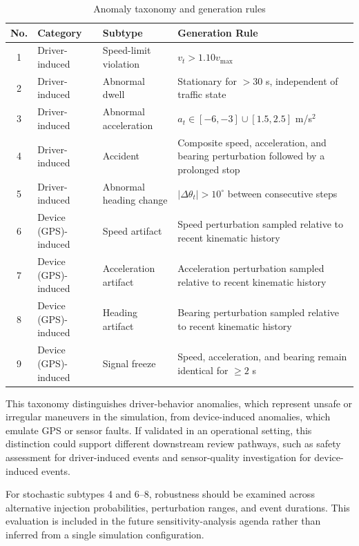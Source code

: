 \documentclass[journal]{IEEEtran}
\begin{document}
\begin{table}[!htbp]
  \centering
  \caption{Anomaly taxonomy and generation rules}
  \label{tab:anomaly_taxonomy}
  \renewcommand{\arraystretch}{1.15}
  \footnotesize
  \begin{tabularx}{\columnwidth}{@{}c>{\raggedright\arraybackslash}p{}>{\raggedright\arraybackslash}p{}>{\raggedright\arraybackslash}X@{}}
    \toprule
    \textbf{No.} & \textbf{Category} & \textbf{Subtype} & \textbf{Generation Rule} \\ \midrule
    1 & Driver-induced & Speed-limit violation & $v_t > 1.10v_{\max}$ \\
    2 & Driver-induced & Abnormal dwell & Stationary for $>30$ s, independent of traffic state \\
    3 & Driver-induced & Abnormal acceleration & $a_t\in[-6,-3]\cup[1.5,2.5]$ m/s$^2$ \\
    4 & Driver-induced & Accident & Composite speed, acceleration, and bearing perturbation followed by a prolonged stop \\
    5 & Driver-induced & Abnormal heading change & $|\Delta\theta_t|>10^\circ$ between consecutive steps \\
    6 & Device (GPS)-induced & Speed artifact & Speed perturbation sampled relative to recent kinematic history \\
    7 & Device (GPS)-induced & Acceleration artifact & Acceleration perturbation sampled relative to recent kinematic history \\
    8 & Device (GPS)-induced & Heading artifact & Bearing perturbation sampled relative to recent kinematic history \\
    9 & Device (GPS)-induced & Signal freeze & Speed, acceleration, and bearing remain identical for $\geq2$ s \\ \bottomrule
  \end{tabularx}
\end{table}

This taxonomy distinguishes driver-behavior anomalies, which represent unsafe or irregular maneuvers in the simulation, from device-induced anomalies, which emulate GPS or sensor faults. If validated in an operational setting, this distinction could support different downstream review pathways, such as safety assessment for driver-induced events and sensor-quality investigation for device-induced events.

For stochastic subtypes 4 and 6--8, robustness should be examined across alternative injection probabilities, perturbation ranges, and event durations. This evaluation is included in the future sensitivity-analysis agenda rather than inferred from a single simulation configuration.
\end{document}
